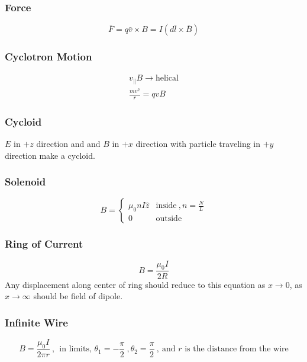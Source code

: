 \documentclass[10pt,letter]{article}
\begin{document}
\subsubsection{Force}
\begin{equation}
 \bar{F} = q\bar{v}\times{B}  = I(d\bar{l} \times \bar{B})
\end{equation}

\subsubsection{Cyclotron Motion}
\begin{align}
 v_\parallel B \rightarrow \textrm{helical}\\
 \frac{mv^2}{r} = qvB
\end{align}

\subsubsection{Cycloid}
$E$ in $+z$ direction and and $B$ in $+x$ direction with particle traveling in $+y$ direction make a cycloid.

\subsubsection{Solenoid}
\[
 B =
  \begin{cases}
   \mu_0nI \hat{z} & \textrm{inside} ~, n=\frac{N}{L}\\
   0 & \textrm{outside}
  \end{cases}
\]

\subsubsection{Ring of Current}
\begin{equation}
 B = \frac{\mu_0I}{2R} 
\end{equation}
Any displacement along center of ring should reduce to this equation as $x \rightarrow 0$, as $x \rightarrow \infty$ should be field of dipole.

\subsubsection{Infinite Wire}
\begin{equation}
 B = \frac{\mu_0I}{2\pi r}~,~~ \textrm{in limits, }\theta_1 = -\frac{\pi}{2}~, \theta_2 = \frac{\pi}{2}~,~\textrm{and } r \textrm{ is the distance from the wire}
\end{equation}
\end{document}
